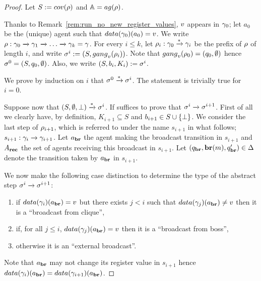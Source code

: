 \ifproofs
\begin{proof}
	Let $\covset := \statesin{\run}$ and $\agents = \agentsof{\run}$.
	
	Thanks to Remark~\ref{rem:run_no_new_register_values},  $v$ appears in $\gamma_0$; let $a_0$ be the (unique) agent such that $\data{\config_0}(a_0) = \aval$. We write $\rho : \gamma_0 \xrightarrow{} \gamma_1 \xrightarrow{} \dots \xrightarrow{} \gamma_k = \gamma$. For every $i \leq k$, let $\rho_i : \gamma_0 \xrightarrow{*} \gamma_i$ be the prefix of $\rho$ of length $i$, and write $\aconfig^i := (\covset, \gangof{\aval}{\run_i})$. Note that $\gangof{\aval}{\run_0} = (q_0, \emptyset)$ hence $\sigma^0 = (S, q_0, \emptyset)$. Also, we write $(\covset, \boss_i, \clique_i) := \aconfig^i$.
	
	We prove by induction on $i$ that $\sigma^0 \xrightarrow{*} \sigma^i$.
	The statement is trivially true for $i =0$. 
	
	Suppose now that $(S, \emptyset, \bot) \xrightarrow{*} \sigma^i$. 
	If suffices to prove that $\sigma^i \xrightarrow{} \sigma^{i+1}$. First of all we clearly have, by definition, $K_{i+1} \subseteq S$ and $\boss_{i+1}\in S\cup\set{\noboss}$. We consider the last step of $\rho_{i+1}$, which is referred to under the name $s_{i+1}$ in what follows; $s_{i+1}: \gamma_i \xrightarrow{} \gamma_{i+1}$. Let $a_{\textbf{br}}$ the agent making the broadcast transition in $s_{i+1}$ and $A_{\textbf{rec}}$ the set of agents receiving this broadcast in $s_{i+1}$. Let $(q_{\textbf{br}}, \textbf{br}(m), q_{\textbf{br}}') \in \Delta$ denote the transition taken by $a_{\textbf{br}}$ in $s_{i+1}$.
	
	We now make the following case distinction to determine the type of the abstract step $\sigma^i \xrightarrow{} \sigma^{i+1}$:
	\begin{enumerate}
		\item\label{proof_completeness:case_broadcast_clique} if $\data{\config_{i}}(\agentbr) = \aval$ but there exists $j<i$ such that $\data{\config_{j}}(\agentbr) \ne \aval$ then it is a ``broadcast from clique'',
		\item\label{proof_completeness:case_broadcast_boss} if, for all $j \leq i$, $\data{\config_j}(\agentbr) = \aval$ then it is a ``broadcast from boss'',
		\item\label{proof_completeness:case_external_broadcast} otherwise it is an ``external broadcast''. 
	\end{enumerate}
	Note that $a_{\textbf{br}}$ may not change its register value in $s_{i+1}$ hence $\data{\config_i}(\agentbr) = \data{\config_{i+1}}(\agentbr)$. 
	

\end{proof}

